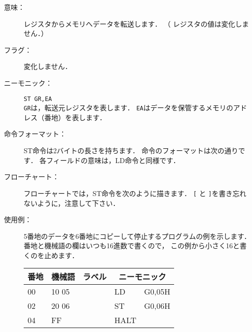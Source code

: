 \begin{description}
\item[意味：]レジスタからメモリへデータを転送します．
  （
    レジスタの値は変化しません．） 

\item[フラグ：]変化しません．

\item[ニーモニック：]\texttt{ST  GR,EA} \\
  \texttt{GR}は，転送元レジスタを表します．
  \texttt{EA}はデータを保管するメモリのアドレス（番地）を表します．

\item[命令フォーマット：]ST命令は2バイトの長さを持ちます．
  命令のフォーマットは次の通りです．
  各フィールドの意味は，LD命令と同様です．


\item[フローチャート：]フローチャートでは，ST命令を次のように描きます．
  \texttt{[} と \texttt{]}を書き忘れないように，注意して下さい．

  \begin{center}
  \end{center}

\item[使用例：]
  5番地のデータを6番地にコピーして停止するプログラムの例を示します．
  番地と機械語の欄はいつも16進数で書くので，
  この例から小さく16と書くのを止めます．

  {\ttfamily\small\begin{center}
    \begin{tabular}{|l|l|l|l l|} \hline
      番地 & 機械語 & ラベル & \multicolumn{2}{|c|}{ニーモニック} \\
      \hline
      00 & 10 05 & & LD   & G0,05H \\
      02 & 20 06 & & ST   & G0,06H\\
      04 & FF    & & HALT & \\
      \hline
    \end{tabular}
  \end{center}}
\end{description}


